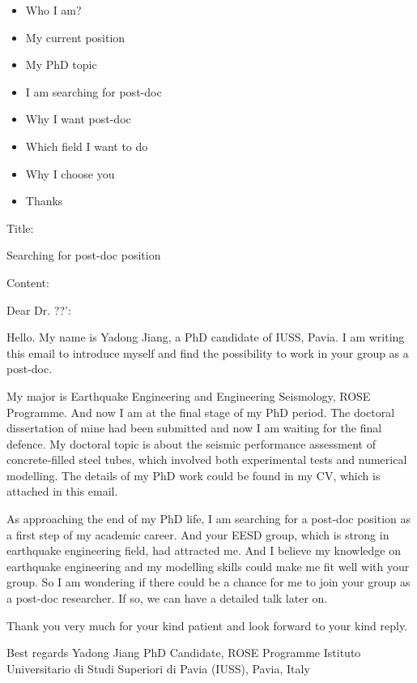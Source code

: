\documentclass[a4paper]{article}
\begin{document}
\begin{itemize}
	\item Who I am?
	\item My current position
	\item My PhD topic
	\item I am searching for post-doc
	\item Why I want post-doc
	\item Which field I want to do
	\item Why I choose you
	\item Thanks
\end{itemize}




Title:

Searching for post-doc position

Content:

Dear Dr. ??':

Hello. My name is Yadong Jiang, a PhD candidate of IUSS, Pavia. I am writing this email to introduce myself and find the possibility to work in your group as a post-doc.

My major is Earthquake Engineering and Engineering Seismology, ROSE Programme. And now I am at the final stage of my PhD period. The doctoral dissertation of mine had been submitted and now I am waiting for the final defence. My doctoral topic is about the seismic performance assessment of concrete-filled steel tubes, which involved both experimental tests and numerical modelling. The details of my PhD work could be found in my CV, which is attached in this email. 

As approaching the end of my PhD life, I am searching for a post-doc position as a first step of my academic career. And your EESD group, which is strong in earthquake engineering field, had attracted me. And I believe my knowledge on earthquake engineering and my modelling skills could make me fit well with your group. So I am wondering if there could be a chance for me to join your group as a post-doc researcher. If so, we can have a detailed talk later on. 

Thank you very much for your kind patient and look forward to your kind reply.

Best regards
Yadong Jiang
PhD Candidate, ROSE Programme
Istituto Universitario di Studi Superiori di Pavia (IUSS), Pavia, Italy
\end{document}
